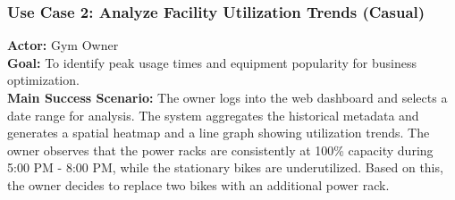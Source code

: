 \subsubsection{Use Case 2: Analyze Facility Utilization Trends (Casual)}
\textbf{Actor:} Gym Owner \\
\textbf{Goal:} To identify peak usage times and equipment popularity for business optimization. \\
\textbf{Main Success Scenario:}
The owner logs into the web dashboard and selects a date range for analysis. The system aggregates the historical metadata and generates a spatial heatmap and a line graph showing utilization trends. The owner observes that the power racks are consistently at 100\% capacity during 5:00 PM - 8:00 PM, while the stationary bikes are underutilized. Based on this, the owner decides to replace two bikes with an additional power rack.


